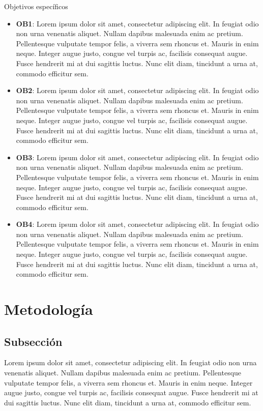\documentclass[letterpaper,twoside,10pt]{report}
\begin{document}
Objetivos específicos
\begin{itemize}
	\item \textbf{OB1}: Lorem ipsum dolor sit amet, consectetur adipiscing elit. In feugiat odio non urna venenatis aliquet. Nullam dapibus malesuada enim ac pretium. Pellentesque vulputate tempor felis, a viverra sem rhoncus et. Mauris in enim neque. Integer augue justo, congue vel turpis ac, facilisis consequat augue. Fusce hendrerit mi at dui sagittis luctus. Nunc elit diam, tincidunt a urna at, commodo efficitur sem.
	\item \textbf{OB2}: Lorem ipsum dolor sit amet, consectetur adipiscing elit. In feugiat odio non urna venenatis aliquet. Nullam dapibus malesuada enim ac pretium. Pellentesque vulputate tempor felis, a viverra sem rhoncus et. Mauris in enim neque. Integer augue justo, congue vel turpis ac, facilisis consequat augue. Fusce hendrerit mi at dui sagittis luctus. Nunc elit diam, tincidunt a urna at, commodo efficitur sem.
	\item \textbf{OB3}: Lorem ipsum dolor sit amet, consectetur adipiscing elit. In feugiat odio non urna venenatis aliquet. Nullam dapibus malesuada enim ac pretium. Pellentesque vulputate tempor felis, a viverra sem rhoncus et. Mauris in enim neque. Integer augue justo, congue vel turpis ac, facilisis consequat augue. Fusce hendrerit mi at dui sagittis luctus. Nunc elit diam, tincidunt a urna at, commodo efficitur sem.
	\item \textbf{OB4}: Lorem ipsum dolor sit amet, consectetur adipiscing elit. In feugiat odio non urna venenatis aliquet. Nullam dapibus malesuada enim ac pretium. Pellentesque vulputate tempor felis, a viverra sem rhoncus et. Mauris in enim neque. Integer augue justo, congue vel turpis ac, facilisis consequat augue. Fusce hendrerit mi at dui sagittis luctus. Nunc elit diam, tincidunt a urna at, commodo efficitur sem.

\end{itemize}

\section{Metodología}

\subsection{Subsección}\label{InvestigacionDiseno}

Lorem ipsum dolor sit amet, consectetur adipiscing elit. In feugiat odio non urna venenatis aliquet. Nullam dapibus malesuada enim ac pretium. Pellentesque vulputate tempor felis, a viverra sem rhoncus et. Mauris in enim neque. Integer augue justo, congue vel turpis ac, facilisis consequat augue. Fusce hendrerit mi at dui sagittis luctus. Nunc elit diam, tincidunt a urna at, commodo efficitur sem.
\end{document}
